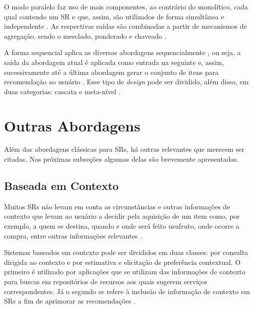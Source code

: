    O modo paralelo faz uso de mais componentes, ao contrário do monolítico, cada qual contendo um SR e que, assim, são utilizados de forma simultânea e independente \cite{Aggarwal2016}. As respectivas saídas são combinadas a partir de mecanismos de agregação, sendo o mesclado, ponderado e chaveado \cite{Jannach2010}. 
    
    A forma sequencial aplica as diversas abordagens sequencialmente \cite{Jannach2010}, ou seja, a saída da abordagem atual é aplicada como entrada na seguinte e, assim, sucessivamente até a última abordagem gerar o conjunto de itens para recomendação ao usuário \cite{Burke2002}. Esse tipo de \textit{design} pode ser dividido, além disso, em duas categorias: cascata e meta-nível \cite{Jannach2010}.
    

\section{Outras Abordagens}
    
    Além das abordagens clássicas para SRs, há outras relevantes que merecem ser citadas. Nas próximas subseções algumas delas são brevemente apresentadas.
    
    \subsection{Baseada em Contexto}
    
    Muitos SRs não levam em conta as circunstâncias e outras informações de contexto que levam ao usuário a decidir pela aquisição de um item como, por exemplo, a quem se destina, quando e onde será feito usufruto, onde ocorre a compra, entre outras informações relevantes \cite{Ricci2010, Panniello2012}.
    
    Sistemas baseados em contexto pode ser divididos em duas classes: por consulta dirigida ao contexto e por estimativa e elicitação de preferência contextual. O primeiro é utilizado por aplicações que se utilizam das informações de contexto para buscas em repositórios de recursos aos quais sugerem serviços correspondentes. Já o segundo se refere à inclusão de informação de contexto em SRs a fim de aprimorar as recomendações \cite{Panniello2012}.
    
